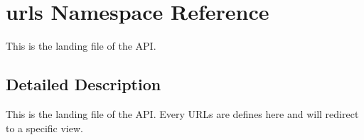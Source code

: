 \hypertarget{namespaceurls}{\section{urls Namespace Reference}
\label{namespaceurls}
}


This is the landing file of the A\-P\-I.  




\subsection{Detailed Description}
This is the landing file of the A\-P\-I. Every U\-R\-Ls are defines here and will redirect to a specific view. 